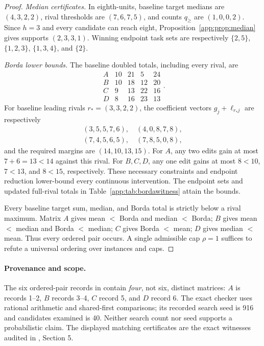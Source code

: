 \begin{proof}
\emph{Median certificates.}
In eighth-units, baseline target medians are $(4,3,2,2)$, rival thresholds are $(7,6,7,5)$, and counts $q_{\geq}$ are $(1,0,0,2)$. Since $h=3$ and every candidate can reach eight, Proposition~\ref{app:prop:median} gives supports $(2,3,3,1)$. Winning endpoint task sets are respectively $\{2,5\}$, $\{1,2,3\}$, $\{1,3,4\}$, and $\{2\}$.

\emph{Borda lower bounds.}
The baseline doubled totals, including every rival, are
\[
 \begin{array}{c|rrrr}
 A&10&21&5&24\\
 B&10&18&12&20\\
 C&9&13&22&16\\
 D&8&16&23&13
 \end{array}.
\]
For baseline leading rivals $r_*=(3,3,2,2)$, the coefficient vectors $g_j+\ell_{r_*j}$ are respectively
\[
 \begin{gathered}
 (3,5,5,7,6),\quad(4,0,8,7,8),\\
 (7,4,5,6,5),\quad(7,8,5,0,8),
 \end{gathered}
\]
and the required margins are $(14,10,13,15)$. For $A$, any two edits gain at most $7+6=13<14$ against this rival. For $B,C,D$, any one edit gains at most $8<10$, $7<13$, and $8<15$, respectively. These necessary constraints and endpoint reduction lower-bound every continuous intervention. The endpoint sets and updated full-rival totals in Table~\ref{app:tab:bordawitness} attain the bounds.

\begin{table}[t]
\centering\small
\caption{Exact Borda upper-bound witnesses from , Section 5. All totals are doubled points; rival totals are updated. Task indices are one-based.}
\label{app:tab:bordawitness}

\end{table}

Every baseline target sum, median, and Borda total is strictly below a rival maximum. Matrix $A$ gives mean $<$ Borda and median $<$ Borda; $B$ gives mean $<$ median and Borda $<$ median; $C$ gives Borda $<$ mean; $D$ gives median $<$ mean. Thus every ordered pair occurs. A single admissible cap $\rho=1$ suffices to refute a universal ordering over instances and caps.
\end{proof}

\paragraph{Provenance and scope.}
The six ordered-pair records in  contain \emph{four}, not six, distinct matrices: $A$ is records 1--2, $B$ records 3--4, $C$ record 5, and $D$ record 6. The exact checker  uses rational arithmetic and shared-first comparisons; its recorded search seed is 916 and candidates examined is 40. Neither search count nor seed supports a probabilistic claim. The displayed matching certificates are the exact witnesses audited in , Section 5.

